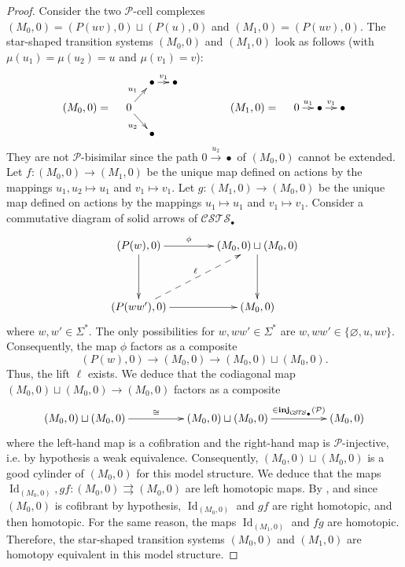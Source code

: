 \documentclass[a4paper,12pt]{amsart}
\begin{document}
\begin{proof} Consider the two $\mathcal{P}$-cell complexes $(M_0,0)=(P(uv),0)
\sqcup (P(u),0)$ and $(M_1,0)=(P(uv),0)$.  The star-shaped transition
systems $(M_0,0)$ and $(M_1,0)$ look as follows (with
$\mu(u_1)=\mu(u_2)=u$ and $\mu(v_1)=v$):
\[
\xymatrix@C=1em@R=1em
{
&& \bullet {\ar@{->}[r]^-{{v_1}}} & \bullet  \\
(M_0,0) = & 0 \ar@{->}[ru]^-{u_1}\ar@{->}[rd]_-{u_2}&&&&& (M_1,0) = & 0 {\ar@{->}[r]^-{{u_1}}} &\bullet {\ar@{->}[r]^-{{v_1}}}&\bullet \\
&& \bullet \\
}
\]
They are not $\mathcal{P}$-bisimilar since the path
$0\stackrel{u_2}\to\bullet$ of $(M_0,0)$ cannot be extended. Let
$f:(M_0,0) \to (M_1,0)$ be the unique map defined on actions by the
mappings $u_1,u_2\mapsto u_1$ and $v_1 \mapsto v_1$. Let $g:(M_1,0)
\to (M_0,0)$ be the unique map defined on actions by the mappings
$u_1\mapsto u_1$ and $v_1 \mapsto v_1$. Consider a commutative diagram
of solid arrows of ${\mathcal{C\!S\!T\!S}}_\bullet$
\[
\xymatrix@C=4em@R=4em
{
(P(w),0) {\ar@{->}[r]^-{{\phi}}} {\ar@{->}[d]_-{{}}} & (M_0,0) \sqcup (M_0,0) {\ar@{->}[d]_-{{}}} \\
(P(ww'),0) {\ar@{->}[r]^-{{}}} \ar@{-->}[ru]^-{\ell} &(M_0,0)
}
\]
where $w,w'\in \Sigma^*$. The only possibilities for $w,ww'\in
\Sigma^*$ are $w,ww'\in \{\varnothing,u,uv\}$. Consequently, the map
$\phi$ factors as a composite
\[(P(w),0) \longrightarrow (M_0,0) \longrightarrow (M_0,0) \sqcup
(M_0,0).\] Thus, the lift $\ell$ exists. We deduce that the codiagonal
map $(M_0,0)\sqcup (M_0,0) \to (M_0,0)$ factors as a
composite \[\xymatrix@C=5em{(M_0,0)\sqcup (M_0,0) {\ar@{->}[r]^-{{\cong}}}&
  (M_0,0)\sqcup (M_0,0) {\ar@{->}[r]^-{{\in\operatorname{{{\rm{\mathbf{{inj}}}}}}_{{\mathcal{C\!S\!T\!S}}_\bullet}(\mathcal{P})}}}&
  (M_0,0)}\] where the left-hand map is a cofibration and the
right-hand map is $\mathcal{P}$-injective, i.e. by hypothesis a weak
equivalence. Consequently, $(M_0,0)\sqcup (M_0,0)$ is a good cylinder
of $(M_0,0)$ for this model structure. We deduce that the maps
$\operatorname{Id}_{(M_0,0)},gf:(M_0,0)\rightrightarrows (M_0,0)$ are left homotopic
maps. By \cite[Proposition~7.4.8]{ref_model2}, and since $(M_0,0)$ is
cofibrant by hypothesis, $\operatorname{Id}_{(M_0,0)}$ and $gf$ are right homotopic,
and then homotopic.  For the same reason, the maps $\operatorname{Id}_{(M_1,0)}$ and
$fg$ are homotopic. Therefore, the star-shaped transition systems
$(M_0,0)$ and $(M_1,0)$ are homotopy equivalent in this model
structure.  \end{proof}
\end{document}
